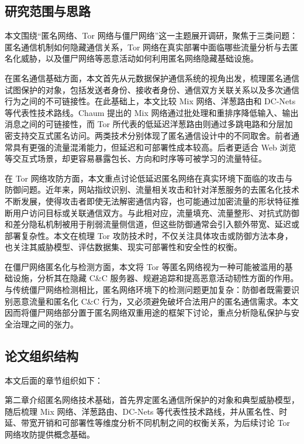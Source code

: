 \subsection{研究范围与思路}

本文围绕“匿名网络、Tor 网络与僵尸网络”这一主题展开调研，聚焦于三类问题：匿名通信机制如何隐藏通信关系，Tor 网络在真实部署中面临哪些流量分析与去匿名化威胁，以及僵尸网络等恶意活动如何利用匿名网络隐藏基础设施。

在匿名通信基础方面，本文首先从元数据保护通信系统的视角出发，梳理匿名通信试图保护的对象，包括发送者身份、接收者身份、通信双方关联关系以及多次通信行为之间的不可链接性\cite{sasy2024sok}。在此基础上，本文比较 Mix 网络、洋葱路由和 DC-Nets 等代表性技术路线。Chaum 提出的 Mix 网络通过批处理和重排序降低输入、输出消息之间的可链接性\cite{chaum1981untraceable}，而 Tor 所代表的低延迟洋葱路由则通过多跳电路和分层加密支持交互式匿名访问\cite{dingledine2004tor}。两类技术分别体现了匿名通信设计中的不同取舍。前者通常具有更强的流量混淆能力，但延迟和可部署性成本较高。后者更适合 Web 浏览等交互式场景，却更容易暴露包长、方向和时序等可被学习的流量特征。

在 Tor 网络攻防方面，本文重点讨论低延迟匿名网络在真实环境下面临的攻击与防御问题。近年来，网站指纹识别、流量相关攻击和针对洋葱服务的去匿名化技术不断发展，使得攻击者即使无法解密通信内容，也可能通过加密流量的形状特征推断用户访问目标或关联通信双方。与此相对应，流量填充、流量整形、对抗式防御和差分隐私机制被用于削弱流量侧信道，但这些防御通常会引入额外带宽、延迟或部署复杂性。本文在梳理 Tor 攻防技术时，不仅关注具体攻击或防御方法本身，也关注其威胁模型、评估数据集、现实可部署性和安全性的权衡。

在僵尸网络匿名化与检测方面，本文将 Tor 等匿名网络视为一种可能被滥用的基础设施，分析其在隐藏 C\&C 服务器、规避追踪和提高恶意活动韧性方面的作用。与传统僵尸网络检测相比，匿名网络环境下的检测问题更加复杂：防御者既需要识别恶意流量和匿名化 C\&C 行为，又必须避免破坏合法用户的匿名通信需求。本文因而将僵尸网络部分置于匿名网络双重用途的框架下讨论，重点分析隐私保护与安全治理之间的张力。

\subsection{论文组织结构}

本文后面的章节组织如下：

第二章介绍匿名网络技术基础，首先界定匿名通信所保护的对象和典型威胁模型，随后梳理 Mix 网络、洋葱路由、DC-Nets 等代表性技术路线，并从匿名性、时延、带宽开销和可部署性等维度分析不同机制之间的权衡关系，为后续讨论 Tor 网络攻防提供概念基础。

